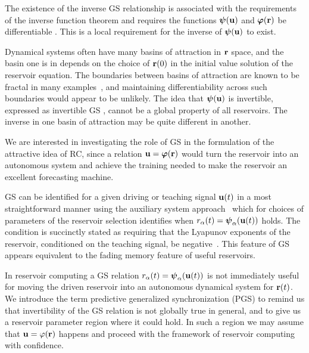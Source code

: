 \documentclass[12pt]{article}
\begin{document}
The existence of the inverse GS relationship is associated with the requirements of the inverse function theorem and requires the functions $\mbox{$\boldsymbol{\psi}$}(\mbox{$\bf{u}$})$ and $\mbox{$\boldsymbol{\varphi}$}(\mbox{{\bf r}})$ be differentiable \cite{Hunt97}. This is a local requirement for the inverse of $\mbox{$\boldsymbol{\psi}$}(\mbox{$\bf{u}$})$ to exist.

Dynamical systems often have many basins of attraction in $\mbox{{\bf r}}$ space, and the basin one is in depends on the choice of $\mbox{{\bf r}}(0)$ in the initial value solution of the reservoir equation. The boundaries between basins of attraction are known to be fractal in many examples~\cite{mc85}, and maintaining differentiability across such boundaries would appear to be unlikely. The idea that $\mbox{$\boldsymbol{\psi}$}(\mbox{$\bf{u}$})$ is invertible, expressed as invertible GS \cite{Lu20}, cannot be a global property of all reservoirs. The inverse in one basin of attraction may be quite different in another.


We are interested in investigating the role of GS in the formulation of the attractive idea of RC, since a relation $\mbox{$\bf{u}$}=\mbox{$\boldsymbol{\varphi}$}(\mbox{{\bf r}})$ would turn the reservoir into an autonomous system and achieve the training needed to make the reservoir an excellent forecasting machine.

GS can be identified for a given driving or teaching signal $\mbox{$\bf{u}$}(t)$ in a most straightforward manner using the auxiliary system approach~\cite{ars96} which for choices of parameters of the reservoir selection identifies when
$r_{\alpha}(t) = \mbox{$\boldsymbol{\psi}$}_{\alpha}(\mbox{$\bf{u}$}(t))$ holds. The condition is succinctly stated as requiring that the Lyapunov exponents of the reservoir, conditioned on the teaching signal, be negative~\cite{pc90}. This feature of GS appears equivalent to the fading memory feature of useful reservoirs.

In reservoir computing a GS relation $r_{\alpha}(t) = \mbox{$\boldsymbol{\psi}$}_{\alpha}(\mbox{$\bf{u}$}(t))$ is not immediately useful for moving the driven reservoir into an autonomous dynamical system for $\mbox{{\bf r}}(t)$. We introduce the term predictive generalized synchronization (PGS) to remind us that invertibility of the GS relation is not globally true in general, and to give us a reservoir parameter region where it could hold. In such a region we may assume that $\mbox{$\bf{u}$} = \varphi(\mbox{{\bf r}})$ happens and proceed with the framework of reservoir computing with confidence.
\end{document}
